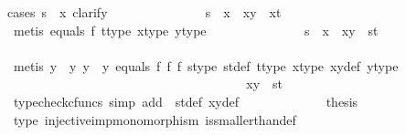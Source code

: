 \begin{isabellebody}
{\isacharparenleft}{\kern0pt}cases\ {\isachardoublequoteopen}s\ {\isacharequal}{\kern0pt}\ x{\isachardoublequoteclose}{\isacharcomma}{\kern0pt}\ clarify{\isacharparenright}{\kern0pt}\isanewline
\ \ \ \ \ \ \ \ \ \ \ \ \ \isamarkupfalse%
\ {\isachardoublequoteopen}s\ {\isacharequal}{\kern0pt}\ x\ {\isasymLongrightarrow}\ {\isasymlangle}x{\isacharcomma}{\kern0pt}y{\isasymrangle}\ {\isacharequal}{\kern0pt}\ {\isasymlangle}x{\isacharcomma}{\kern0pt}t{\isasymrangle}{\isachardoublequoteclose}\isanewline
\ \ \ \ \ \ \ \ \ \ \ \ \ \ \ \isamarkupfalse%
\ {\isacharparenleft}{\kern0pt}metis\ equals{}\ f{}\ t{\isacharunderscore}{\kern0pt}type\ x{\isacharunderscore}{\kern0pt}type\ y{\isacharunderscore}{\kern0pt}type{\isacharparenright}{\kern0pt}\isanewline
\ \ \ \ \ \ \ \ \ \ \ \ \ \isamarkupfalse%
\ {\isachardoublequoteopen}s\ {\isasymnoteq}\ x\ {\isasymLongrightarrow}\ {\isasymlangle}x{\isacharcomma}{\kern0pt}y{\isasymrangle}\ {\isacharequal}{\kern0pt}\ {\isasymlangle}s{\isacharcomma}{\kern0pt}t{\isasymrangle}{\isachardoublequoteclose}\isanewline
\ \ \ \ \ \ \ \ \ \ \ \ \ \ \ \isamarkupfalse%
\ {\isacharparenleft}{\kern0pt}metis\ {\isacartoucheopen}y\ {\isasymnoteq}\ y{}{\isacartoucheclose}\ {\isacartoucheopen}y\ {\isasymnoteq}\ y{}{\isacartoucheclose}\ equals\ f{}\ f{}\ f{}\ s{\isacharunderscore}{\kern0pt}type\ st{\isacharunderscore}{\kern0pt}def\ t{\isacharunderscore}{\kern0pt}type\ x{\isacharunderscore}{\kern0pt}type\ xy{\isacharunderscore}{\kern0pt}def\ y{\isacharunderscore}{\kern0pt}type{\isacharparenright}{\kern0pt}\isanewline
\ \ \ \ \ \ \ \ \ \ \ \isamarkupfalse%
\isanewline
\ \ \ \ \ \ \ \ \ \isamarkupfalse%
\isanewline
\ \ \ \ \ \ \ \isamarkupfalse%
\isanewline
\ \ \ \ \ \isamarkupfalse%
\ \isamarkupfalse%
\ {\isachardoublequoteopen}xy\ {\isacharequal}{\kern0pt}\ st{\isachardoublequoteclose}\isanewline
\ \ \ \ \ \ \ \isamarkupfalse%
\ {\isacharparenleft}{\kern0pt}typecheck{\isacharunderscore}{\kern0pt}cfuncs{\isacharcomma}{\kern0pt}\ simp\ add{\isacharcolon}{\kern0pt}\ \ st{\isacharunderscore}{\kern0pt}def\ xy{\isacharunderscore}{\kern0pt}def{\isacharparenright}{\kern0pt}\isanewline
\ \ \ \isamarkupfalse%
\isanewline
\ \ \ \ \ \ \isamarkupfalse%
\ \isamarkupfalse%
\ {\isacharquery}{\kern0pt}thesis\isanewline
\ \ \ \ \ \ \ \ \isamarkupfalse%
\ {\isasymTheta}{\isacharunderscore}{\kern0pt}type\ injective{\isacharunderscore}{\kern0pt}imp{\isacharunderscore}{\kern0pt}monomorphism\ is{\isacharunderscore}{\kern0pt}smaller{\isacharunderscore}{\kern0pt}than{\isacharunderscore}{\kern0pt}def\ \isamarkupfalse%

\end{isabellebody}
